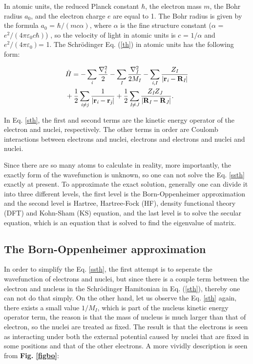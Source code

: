 \documentclass[a4paper, 12pt, titlepage,oneside,drop]{kthesis}
\begin{document}
In atomic units, the reduced Planck constant $\hbar$, the electron mass $m$, the Bohr radius $a_0$, and the electron charge
$e$ are equal to 1. The Bohr radius is given by the formula $a_0$ = ${\hbar} / {(mc\alpha)}$, where $\alpha$ is the fine structure
constant ($\alpha$ = ${e^2}/{(4 \pi \varepsilon_0 c \hbar)}$) , so the velocity of light in atomic units is $c$ = $1/{\alpha}$ and ${e^2}/{(4 \pi \varepsilon_0)}$= 1. The Schrödinger Eq. (\ref{th}) in atomic units has 
the following form:

\begin{equation}\label{sth}\begin{split}
&\hath = - \sumi<i>   \frac{{{\nabla}_{\textit{i}}^{2}}}{2} - \sumi<I> \frac{{{\nabla}_{\textit{I}}^{2}}}{2 M_\textit{I}}  - \sumij<i><I> \frac{Z_\textit{I}}{|\textbf{r}_\textit{i}-\textbf{R}_\textit{I}|} \\
& + \frac{1}{2} \suminj<i><j> \frac{1}{ |\textbf{r}_\textit{i}-\textbf{r}_\textit{j}|} + \frac{1}{2} \suminj<I><J> \frac{Z_\textit{I} Z_\textit{J}\ }{|\textbf{R}_\textit{I}-\textbf{R}_\textit{J}|}.
\end{split}\end{equation}

In Eq. \ref{sth}, the first and second terms are the kinetic energy operator of the electron and nuclei, respectively.
The other terms in order are Coulomb interactions between electrons and nuclei, electrons and electrons and nuclei and nuclei.

Since there are so many atoms to calculate in reality, more importantly, the exactly form of the wavefunction is unknown,
so one can not solve the Eq. \ref{ssth} exactly at present. To approximate the exact solution, 
generally one can divide it into three different levels, the first level is the Born-Oppenheimer approximation and the second level is Hartree,
Hartree-Fock (HF), density functional theory (DFT) and Kohn-Sham (KS) equation, and the last level is to solve the secular equation, 
which is an equation that is solved to find the eigenvalue of matrix.

\subsection{The Born-Oppenheimer approximation}
\label{ch:boa}

In order to simplify the Eq. \ref{ssth}, the first attempt is to seperate the wavefunction of electrons and nuclei, but since there is a couple term between the electron and nucleus in the Schrödinger Hamitonian in Eq. (\ref{sth}), 
thereby one can not do that simply. On the other hand, let us observe the Eq. \ref{sth} again, there exists a small value ${1}/{M_I}$, which is part of the nucleus kinetic energy
operator term, the reason is that the mass of nucleus is much larger than that of electron, so the nuclei are treated as fixed. The result is that the electrons is seen as interacting under both the external potential caused by nuclei that are fixed in 
some positions and that of the other electrons. A more vividly description is seen from \textbf{Fig. \ref{figbo}}:
\end{document}

